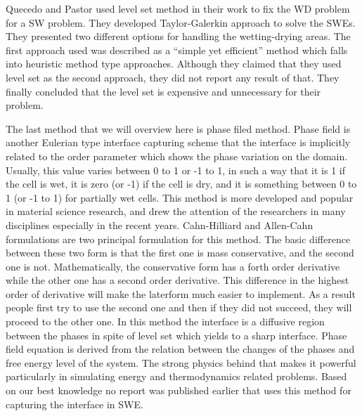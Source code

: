 \documentclass[letterpaper,10pt]{article}
\begin{document}
Quecedo and Pastor\cite{quecedo2002rtg} used level set method in their work to fix the WD problem for a SW problem.
They developed Taylor-Galerkin approach to solve the SWEs. They presented two different options for handling the wetting-drying 
areas. The first approach used was described as a ``simple yet efficient'' method which falls into heuristic method type 
approaches. Although they claimed that they used level set as the second approach, they did not report any result of that.
They finally concluded that the level set is expensive and unnecessary for their problem.\newline


The last method that we will overview here is phase filed method. Phase field is another Eulerian type interface capturing
scheme that the interface is implicitly related to the order parameter which shows the phase variation on the domain. 
Usually, this value varies between 0 to 1 or -1 to 1, in such a way that it is 1 if the cell is wet, it is zero (or -1) 
if the cell is dry, and it is something between 0 to 1 (or -1 to 1) for partially wet cells.
This method is more developed and popular in material science research, and drew the attention of the researchers 
in many disciplines especially in the recent years.
Cahn-Hilliard and Allen-Cahn formulations are two principal formulation for this method. The basic difference between these 
two form is that the first one is mass conservative, and the second one is not. Mathematically, the conservative form has a 
forth order derivative while the other one has a second order derivative. This difference in the highest order of derivative 
will make the laterform much easier to implement. As a result people first try to use the second one and then if 
they did not succeed, they will proceed to the other one.
In this method the interface is a diffusive region between the phases in spite of level set which yields to a sharp 
interface. Phase field equation is derived from the relation between the changes of the phases and free energy level of the 
system. The strong physics behind that makes it powerful particularly in simulating energy and thermodynamics related problems.
Based on our best knowledge no report was published earlier that uses this method for capturing the interface in SWE.\newline
\end{document}
